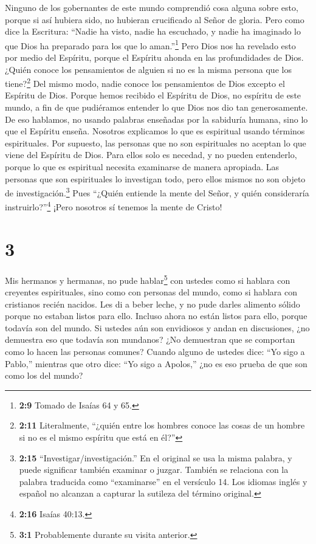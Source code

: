  Ninguno de los gobernantes de este mundo comprendió cosa
alguna sobre esto, porque si así hubiera sido, no hubieran crucificado
al Señor de gloria.  Pero como dice la Escritura: ``Nadie ha
visto, nadie ha escuchado, y nadie ha imaginado lo que Dios ha preparado
para los que lo aman.''\footnote{\textbf{2:9} Tomado de Isaías 64 y 65.}
 Pero Dios nos ha revelado esto por medio del Espíritu,
porque el Espíritu ahonda en las profundidades de Dios. 
¿Quién conoce los pensamientos de alguien si no es la misma persona que
los tiene?\footnote{\textbf{2:11} Literalmente, ``¿quién entre los
  hombres conoce las cosas de un hombre si no es el mismo espíritu que
  está en él?''} Del mismo modo, nadie conoce los pensamientos de Dios
excepto el Espíritu de Dios.  Porque hemos recibido el
Espíritu de Dios, no espíritu de este mundo, a fin de que pudiéramos
entender lo que Dios nos dio tan generosamente.  De eso
hablamos, no usando palabras enseñadas por la sabiduría humana, sino lo
que el Espíritu enseña. Nosotros explicamos lo que es espiritual usando
términos espirituales.  Por supuesto, las personas que no
son espirituales no aceptan lo que viene del Espíritu de Dios. Para
ellos solo es necedad, y no pueden entenderlo, porque lo que es
espiritual necesita examinarse de manera apropiada.  Las
personas que son espirituales lo investigan todo, pero ellos mismos no
son objeto de investigación.\footnote{\textbf{2:15}
  ``Investigar/investigación.'' En el original se usa la misma palabra,
  y puede significar también examinar o juzgar. También se relaciona con
  la palabra traducida como ``examinarse'' en el versículo 14. Los
  idiomas inglés y español no alcanzan a capturar la sutileza del
  término original.}  Pues ``¿Quién entiende la mente del
Señor, y quién consideraría instruirlo?''\footnote{\textbf{2:16} Isaías
  40:13.} ¡Pero nosotros sí tenemos la mente de Cristo!

\hypertarget{section-2}{%
\section{3}\label{section-2}}

 Mis hermanos y hermanas, no pude hablar\footnote{\textbf{3:1}
  Probablemente durante su visita anterior.} con ustedes como si hablara
con creyentes espirituales, sino como con personas del mundo, como si
hablara con cristianos recién nacidos.  Les di a beber
leche, y no pude darles alimento sólido porque no estaban listos para
ello.  Incluso ahora no están listos para ello, porque
todavía son del mundo. Si ustedes aún son envidiosos y andan en
discusiones, ¿no demuestra eso que todavía son mundanos? ¿No demuestran
que se comportan como lo hacen las personas comunes?  Cuando
alguno de ustedes dice: ``Yo sigo a Pablo,'' mientras que otro dice:
``Yo sigo a Apolos,'' ¿no es eso prueba de que son como los del mundo?

